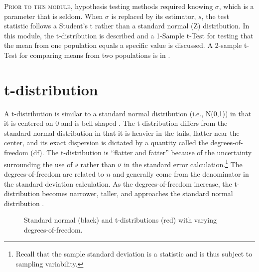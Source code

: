 \documentclass[10pt,openany]{book}\usepackage[]{graphicx}\usepackage[]{color}
\newenvironment{knitrout}{}{} %
\begin{document}
\minitoc
\vspace{12pt}

\lettrine{P}{rior to this module}, hypothesis testing methods required knowing $\sigma$, which is a parameter that is seldom. When $\sigma$ is replaced by its estimator, $s$, the test statistic follows a Student's t rather than a standard normal (Z) distribution. In this module, the t-distribution is described and a 1-Sample t-Test for testing that the mean from one population equals a specific value is discussed. A 2-sample t-Test for comparing means from two populations is in .

\vspace{-12pt}
\section{t-distribution}\label{sect:tDist}
\vspace{-14pt}
A t-distribution is similar to a standard normal distribution (i.e., N(0,1)) in that it is centered on 0 and is bell shaped .  The t-distribution differs from the standard normal distribution in that it is heavier in the tails, flatter near the center, and its exact dispersion is dictated by a quantity called the degrees-of-freedom (df).  The t-distribution is ``flatter and fatter'' because of the uncertainty surrounding the use of $s$ rather than $\sigma$ in the standard error calculation.\footnote{Recall that the sample standard deviation is a statistic and is thus subject to sampling variability.}  The degrees-of-freedom are related to $n$ and generally come from the denominator in the standard deviation calculation.  As the degrees-of-freedom increase, the t-distribution becomes narrower, taller, and approaches the standard normal distribution .

\begin{knitrout}
\color{fgcolor}




























\begin{figure}[hbtp]

{\centering {}

}

\caption[Standard normal (black) and t-distributions (red) with varying degrees-of-freedom]{Standard normal (black) and t-distributions (red) with varying degrees-of-freedom.}\label{fig:tvsZ}
\end{figure}


\end{knitrout}
\end{document}
